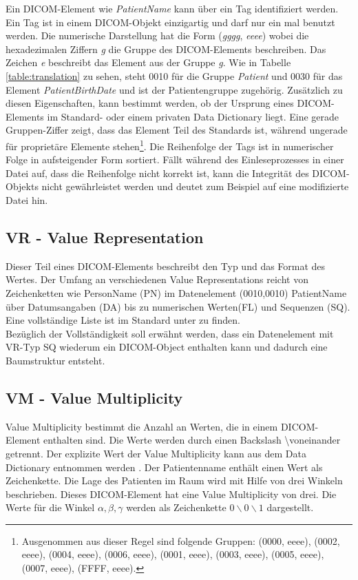 Ein DICOM-Element wie \textit{PatientName} kann über ein Tag identifiziert werden. Ein Tag ist in einem DICOM-Objekt einzigartig und darf nur ein mal benutzt werden. Die numerische Darstellung hat die Form (\textit{gggg}, \textit{eeee}) wobei die hexadezimalen Ziffern \textit{g} die Gruppe des DICOM-Elements beschreiben. Das Zeichen \textit{e} beschreibt das Element  aus der Gruppe \textit{g}. Wie in Tabelle  \ref{table:translation} zu sehen, steht 0010 für die Gruppe \textit{Patient} und 0030 für das Element \textit{PatientBirthDate} und ist der Patientengruppe zugehörig. Zusätzlich zu diesen Eigenschaften, kann bestimmt werden, ob der Ursprung eines DICOM-Elements im Standard- oder einem privaten Data Dictionary liegt. Eine gerade Gruppen-Ziffer zeigt, dass das Element Teil des Standards ist, während ungerade für proprietäre Elemente stehen\footnote{Ausgenommen aus dieser Regel sind folgende Gruppen: (0000, eeee), (0002, eeee), (0004, eeee), (0006, eeee), (0001, eeee), (0003, eeee), (0005, eeee), (0007, eeee), (FFFF, eeee).}\cite[7.1]{dicom:structure}. Die Reihenfolge der Tags ist in numerischer Folge in aufsteigender Form sortiert. Fällt während des Einleseprozesses in einer Datei auf, dass die Reihenfolge nicht korrekt ist, kann die Integrität des DICOM-Objekts nicht gewährleistet werden und deutet zum Beispiel auf eine modifizierte Datei hin.\\

\FloatBarrier
\subsection{VR - Value Representation}
Dieser Teil eines DICOM-Elements beschreibt den Typ und das Format des Wertes\cite[6.2]{dicom:structure}. Der Umfang an verschiedenen Value Representations reicht von Zeichenketten wie PersonName (PN) im Datenelement (0010,0010) PatientName über Datumsangaben (DA) bis zu numerischen Werten(FL) und Sequenzen (SQ). Eine vollständige Liste ist im Standard unter \cite[Table 6.2.1]{dicom:structure} zu finden.\\
Bezüglich der Vollständigkeit soll erwähnt werden, dass ein Datenelement mit VR-Typ SQ wiederum ein DICOM-Object enthalten kann und dadurch eine Baumstruktur entsteht.

\FloatBarrier
\subsection{VM - Value Multiplicity}
Value Multiplicity bestimmt die Anzahl an Werten, die in einem DICOM-Element enthalten sind. Die Werte werden durch einen Backslash \textbackslash voneinander getrennt. Der explizite Wert der Value Multiplicity kann aus dem Data Dictionary entnommen werden \cite[6.4]{dicom:structure}. Der Patientenname enthält einen Wert als Zeichenkette. Die Lage des Patienten im Raum wird mit Hilfe von drei Winkeln beschrieben. Dieses DICOM-Element hat eine Value Multiplicity von drei. Die Werte für die Winkel $\alpha, \beta, \gamma$ werden als Zeichenkette \textit{$0\backslash0\backslash1$} dargestellt.

